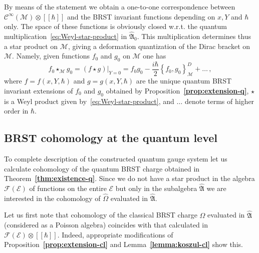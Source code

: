 \documentclass[a4paper,11pt]{amsart}
\numberwithin{thm}{section} %
\numberwithin{equation}{section} %
\numberwithin{figure}{section} %
\newcommand{\bref}[1]{{\bf \ref{#1}}}
\newcommand{\pb}[2]{\left\{{}#1{},{}#2{}\right\}}
\renewcommand{\:}{{\rm\, :\,}}
\newcommand{\func}[1]{{{\mathcal C}^\infty}{(#1)}}             %
\def\tensor{\otimes}
\def\cF{{\mathcal F}}
\def\manM{{\mathcal M}}
\def\qA{{\hat{\mathfrak A}}}
\def\E{{ \mathcal E}}
\begin{document}
By means of the statement we obtain a one-to-one correspondence
between $\func{\manM}\tensor[[\hbar]]$ and the BRST invariant
functions depending on $x,Y$ and $\hbar$ only. The space
of these functions is obviously closed w.r.t. the quantum
multiplication~\eqref{eq:Weyl-star-product} in $\qA_0$. This
multiplication determines thus a star product on $\manM$, giving a
deformation quantization of the Dirac bracket on $\manM$.  Namely, given
functions $f_0$ and $g_0$ on $\manM$ one has
\begin{equation}
  f_0\star_{\manM} g_0=(f \star g){\bigr|}_{Y=0}=
f_0 g_0-\frac{i\hbar}{2}\pb{f_0}{g_0}^D_{\manM}+\ldots\,,
\end{equation}
where $f=f(x,Y,\hbar)$ and $g=g(x,Y,\hbar)$ are the unique quantum
BRST invariant extensions of $f_0$ and $g_0$ obtained by
Proposition~\bref{prop:extension-q}, $\star$ is a Weyl product given
by~\eqref{eq:Weyl-star-product}, and $\ldots$ denote terms of higher
order in $\hbar$.


\subsection{BRST cohomology at the quantum level}\label{subsec:BRST-q}
To complete description of the constructed quantum gauge system
let us calculate cohomology of the quantum BRST charge obtained in
Theorem~\bref{thm:existence-q}.  Since we do not have
a star product in the algebra $\cF(\E)$ of functions on
the entire $\E$ but only in the subalgebra $\qA$ we are interested
in the cohomology of $\hat\Omega$ evaluated in $\qA$.

Let us first note that cohomology of the classical BRST charge
$\Omega$ evaluated in $\qA$ (considered as a Poisson algebra)
coincides with that calculated in $\cF(\E)\tensor[[\hbar]]$. Indeed,
appropriate modifications of Proposition~\bref{prop:extension-cl} and
Lemma~\bref{lemma:koszul-cl} show this.
\end{document}
